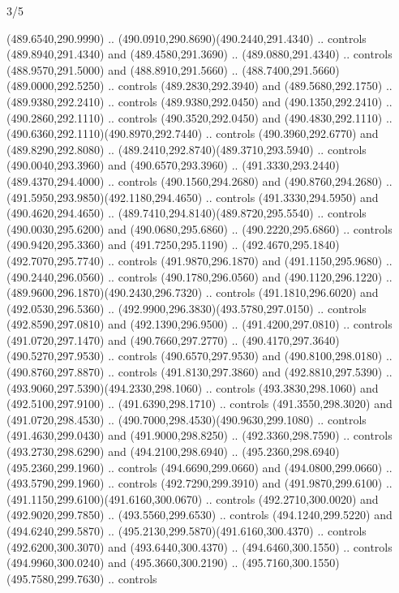\begin{flagdescription}{3/5}
\begin{scope}[shift={(0.5\flaglength,0.5\flagwidth)},scale=\flagwidth/1075]
\begin{scope}[y=0.80pt, x=0.80pt, yscale=-2.37, xscale=2.37,xshift=-402,yshift=-230.4]
  (489.6540,290.9990) .. (490.0910,290.8690)(490.2440,291.4340) .. controls
  (489.8940,291.4340) and (489.4580,291.3690) .. (489.0880,291.4340) .. controls
  (488.9570,291.5000) and (488.8910,291.5660) ..
  (488.7400,291.5660)(489.0000,292.5250) .. controls (489.2830,292.3940) and
  (489.5680,292.1750) .. (489.9380,292.2410) .. controls (489.9380,292.0450) and
  (490.1350,292.2410) .. (490.2860,292.1110) .. controls (490.3520,292.0450) and
  (490.4830,292.1110) .. (490.6360,292.1110)(490.8970,292.7440) .. controls
  (490.3960,292.6770) and (489.8290,292.8080) ..
  (489.2410,292.8740)(489.3710,293.5940) .. controls (490.0040,293.3960) and
  (490.6570,293.3960) .. (491.3330,293.2440)(489.4370,294.4000) .. controls
  (490.1560,294.2680) and (490.8760,294.2680) ..
  (491.5950,293.9850)(492.1180,294.4650) .. controls (491.3330,294.5950) and
  (490.4620,294.4650) .. (489.7410,294.8140)(489.8720,295.5540) .. controls
  (490.0030,295.6200) and (490.0680,295.6860) .. (490.2220,295.6860) .. controls
  (490.9420,295.3360) and (491.7250,295.1190) ..
  (492.4670,295.1840)(492.7070,295.7740) .. controls (491.9870,296.1870) and
  (491.1150,295.9680) .. (490.2440,296.0560) .. controls (490.1780,296.0560) and
  (490.1120,296.1220) .. (489.9600,296.1870)(490.2430,296.7320) .. controls
  (491.1810,296.6020) and (492.0530,296.5360) ..
  (492.9900,296.3830)(493.5780,297.0150) .. controls (492.8590,297.0810) and
  (492.1390,296.9500) .. (491.4200,297.0810) .. controls (491.0720,297.1470) and
  (490.7660,297.2770) .. (490.4170,297.3640)(490.5270,297.9530) .. controls
  (490.6570,297.9530) and (490.8100,298.0180) .. (490.8760,297.8870) .. controls
  (491.8130,297.3860) and (492.8810,297.5390) ..
  (493.9060,297.5390)(494.2330,298.1060) .. controls (493.3830,298.1060) and
  (492.5100,297.9100) .. (491.6390,298.1710) .. controls (491.3550,298.3020) and
  (491.0720,298.4530) .. (490.7000,298.4530)(490.9630,299.1080) .. controls
  (491.4630,299.0430) and (491.9000,298.8250) .. (492.3360,298.7590) .. controls
  (493.2730,298.6290) and (494.2100,298.6940) ..
  (495.2360,298.6940)(495.2360,299.1960) .. controls (494.6690,299.0660) and
  (494.0800,299.0660) .. (493.5790,299.1960) .. controls (492.7290,299.3910) and
  (491.9870,299.6100) .. (491.1150,299.6100)(491.6160,300.0670) .. controls
  (492.2710,300.0020) and (492.9020,299.7850) .. (493.5560,299.6530) .. controls
  (494.1240,299.5220) and (494.6240,299.5870) ..
  (495.2130,299.5870)(491.6160,300.4370) .. controls (492.6200,300.3070) and
  (493.6440,300.4370) .. (494.6460,300.1550) .. controls (494.9960,300.0240) and
  (495.3660,300.2190) .. (495.7160,300.1550)(495.7580,299.7630) .. controls

\end{scope}
\end{scope}
\end{flagdescription}
